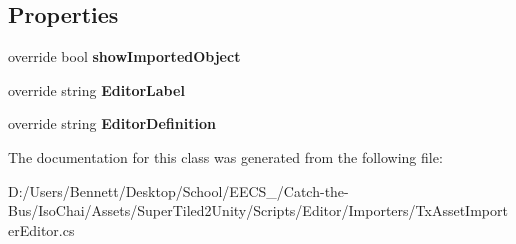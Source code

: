 \subsection*{Properties}
\begin{DoxyCompactItemize}
\item 
\mbox{\label{class_super_tiled2_unity_1_1_editor_1_1_tx_asset_importer_editor_a3f0bd4d724c19f8222f48c9990c3bdfb}} 
override bool {\bfseries show\+Imported\+Object}
\item 
\mbox{\label{class_super_tiled2_unity_1_1_editor_1_1_tx_asset_importer_editor_adb494bd26c579fade4a2971d9b40e980}} 
override string {\bfseries Editor\+Label}
\item 
\mbox{\label{class_super_tiled2_unity_1_1_editor_1_1_tx_asset_importer_editor_a18ef4224e235fa92e18611d9ce1b4b49}} 
override string {\bfseries Editor\+Definition}
\end{DoxyCompactItemize}


The documentation for this class was generated from the following file\+:\begin{DoxyCompactItemize}
\item 
D\+:/\+Users/\+Bennett/\+Desktop/\+School/\+E\+E\+C\+S\+\_/\+Catch-\/the-\/\+Bus/\+Iso\+Chai/\+Assets/\+Super\+Tiled2\+Unity/\+Scripts/\+Editor/\+Importers/Tx\+Asset\+Importer\+Editor.\+cs\end{DoxyCompactItemize}
